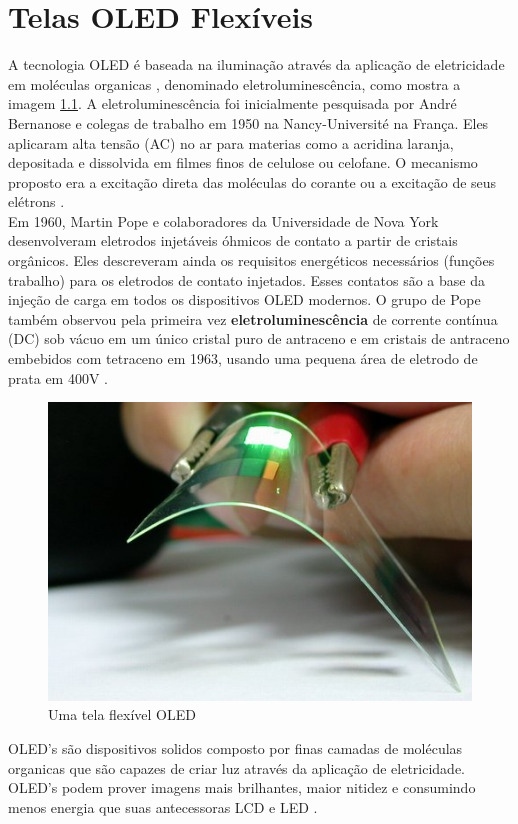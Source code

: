 \chapter{Telas OLED Flexíveis}
\label{cap:oled}

A tecnologia OLED é baseada na iluminação através da aplicação de eletricidade em moléculas organicas \cite{HSWOLED}, denominado    eletroluminescência, como mostra a imagem \ref{fig:oled_early_product}. A eletroluminescência foi inicialmente pesquisada por André Bernanose e colegas de trabalho em 1950 na Nancy-Université na França. Eles aplicaram alta tensão (AC) no ar para materias como a acridina laranja, depositada e dissolvida em filmes finos de celulose ou celofane. O mecanismo proposto era a excitação direta das moléculas do corante ou a excitação de seus elétrons \cite{WikipediaOLED}.\\

Em 1960, Martin Pope e colaboradores da Universidade de Nova York desenvolveram eletrodos injetáveis óhmicos de contato a partir de cristais orgânicos. Eles descreveram ainda os requisitos energéticos necessários (funções trabalho) para os eletrodos de contato injetados. Esses contatos são a base da injeção de carga em todos os dispositivos OLED modernos. O grupo de Pope também observou pela primeira vez {\bf eletroluminescência} de corrente contínua (DC) sob vácuo em um único cristal puro de antraceno e em cristais de antraceno embebidos com tetraceno em 1963, usando uma pequena área de eletrodo de prata em 400V \cite{WikipediaOLED}.\\

\begin{figure}[!ht]
  \centering
  \includegraphics[width=.40\textwidth]{./figuras/oled_early_product} 
  \caption{Uma tela flexível OLED}
  \label{fig:oled_early_product} 
\end{figure}

OLED's são dispositivos solidos composto por finas camadas de moléculas organicas que são capazes de criar luz através da aplicação de eletricidade. OLED's podem prover imagens mais brilhantes, maior nitidez e consumindo menos energia que suas antecessoras LCD e LED \cite{HSWOLED}.\\

